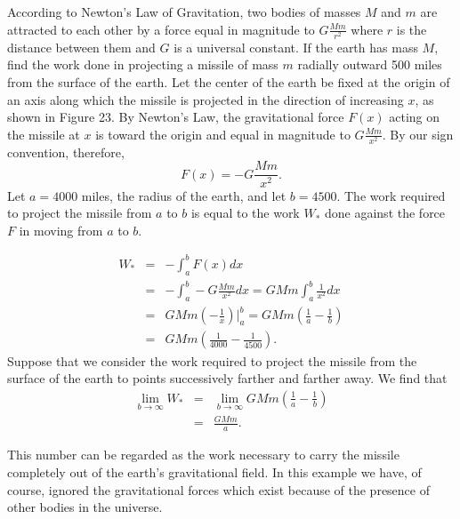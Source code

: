 \begin{example} According to Newton's Law of Gravitation, two bodies of masses $M$ and $m$ are attracted to each other by a force equal in magnitude to $G \frac{Mm}{r^2}$ where $r$ is the distance between them and $G$ is a universal constant. If the earth has mass $M$, find the work done in projecting a missile of mass $m$ radially outward 500 miles from the surface of the earth. Let the center of the earth be fixed at the origin of an axis along which the missile is projected in the direction of increasing $x$, as shown in Figure 23. By Newton's Law, the gravitational force $F(x)$ acting on the missile at $x$ is toward the origin and equal in magnitude to $G \frac{Mm}{x^2}$. By our sign convention, therefore,
$$
F(x) = -G \frac{Mm}{x^2}.
$$
\noindent Let $a = 4000$ miles, the radius of the earth, and let $b = 4500$. The work required to project the missile from $a$ to $b$ is equal to the work $W_*$ done against the force $F$ in moving from $a$ to $b$.


\begin{eqnarray*}
W_* &=& - \int_a^b F(x) dx \\
&=& - \int_a^b -G \frac{Mm}{x^2} dx = GMm \int_a^b \frac{1}{x^2} dx \\
&=& GMm (-\frac{1}{x}) \big|_a^b = GMm (\frac{1}{a} - \frac{1}{b})\\
&=& GMm (\frac{1}{4000} - \frac{1}{4500}) .
\end{eqnarray*}
\noindent Suppose that we consider the work required to project the missile from the surface of the earth to points successively farther and farther away. We find that
\begin{eqnarray*}
\lim_{b \rightarrow \infty} W_* &=& \lim_{b \rightarrow \infty} GMm (\frac{1}{a} - \frac{1}{b} )  \\
&=& \frac{GMm}{a}.
\end{eqnarray*}

\noindent This number can be regarded as the work necessary to carry the missile completely out of the earth's gravitational field. In this example we have, of course, ignored the gravitational forces which exist because of the presence of other bodies in the universe.
\end{example}
\vspace{.2in}

